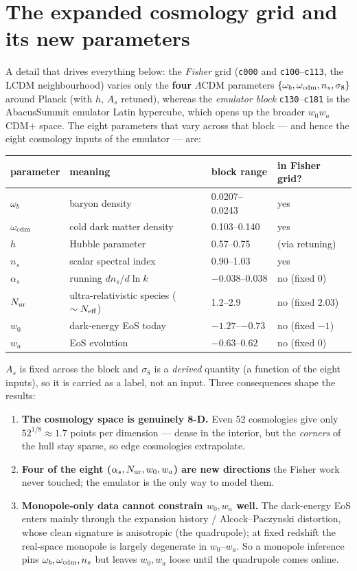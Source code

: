 \documentclass[11pt]{article}
\newcommand{\code}[1]{\texttt{#1}}
\begin{document}
\section{The expanded cosmology grid and its new parameters}
A detail that drives everything below: the \emph{Fisher} grid (\code{c000} and
\code{c100}--\code{c113}, the LCDM neighbourhood) varies only the \textbf{four}
$\Lambda$CDM parameters $\{\omega_b,\omega_{\rm cdm},n_s,\sigma_8\}$ around Planck
(with $h$, $A_s$ retuned), whereas the \emph{emulator block} \code{c130}--\code{c181}
is the AbacusSummit emulator Latin hypercube, which opens up the broader
$w_0w_a$CDM$+$ space. The eight parameters that vary across that block --- and hence
the eight cosmology inputs of the emulator --- are:
\begin{center}\small
\begin{tabular}{llll}
\toprule
parameter & meaning & block range & in Fisher grid?\\
\midrule
$\omega_b$        & baryon density          & 0.0207--0.0243 & yes\\
$\omega_{\rm cdm}$& cold dark matter density& 0.103--0.140   & yes\\
$h$               & Hubble parameter        & 0.57--0.75     & (via retuning)\\
$n_s$             & scalar spectral index   & 0.90--1.03     & yes\\
$\alpha_s$        & running $dn_s/d\ln k$    & $-0.038$--$0.038$ & no (fixed 0)\\
$N_{\rm ur}$      & ultra-relativistic species ($\sim N_{\rm eff}$) & 1.2--2.9 & no (fixed 2.03)\\
$w_0$             & dark-energy EoS today   & $-1.27$--$-0.73$ & no (fixed $-1$)\\
$w_a$             & EoS evolution           & $-0.63$--$0.62$  & no (fixed 0)\\
\bottomrule
\end{tabular}
\end{center}
$A_s$ is fixed across the block and $\sigma_8$ is a \emph{derived} quantity (a
function of the eight inputs), so it is carried as a label, not an input. Three
consequences shape the results:
\begin{enumerate}
\item \textbf{The cosmology space is genuinely 8-D.} Even 52 cosmologies give only
  $52^{1/8}\!\approx\!1.7$ points per dimension --- dense in the interior, but the
  \emph{corners} of the hull stay sparse, so edge cosmologies extrapolate.
\item \textbf{Four of the eight ($\alpha_s,N_{\rm ur},w_0,w_a$) are new directions}
  the Fisher work never touched; the emulator is the only way to model them.
\item \textbf{Monopole-only data cannot constrain $w_0,w_a$ well.} The dark-energy
  EoS enters mainly through the expansion history / Alcock--Paczynski distortion,
  whose clean signature is anisotropic (the quadrupole); at fixed redshift the
  real-space monopole is largely degenerate in $w_0$--$w_a$. So a monopole inference
  pins $\omega_b,\omega_{\rm cdm},n_s$ but leaves $w_0,w_a$ loose until the
  quadrupole comes online.
\end{enumerate}
\end{document}
